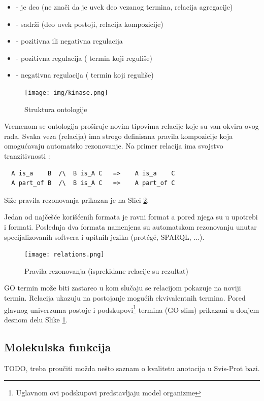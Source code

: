 \begin{itemize}
  \item {}  - je deo  (ne znači da je uvek deo vezanog termina, relacija agregacije)
  \item {} - sadrži (deo uvek postoji, relacija kompozicije)
  \item {} - pozitivna ili negativna regulacija
  \item {} - pozitivna regulacija  
    ( termin koji reguliše)
  \item {} - negativna regulacija 
    ( termin koji reguliše)
\end{itemize}

\begin{figure}[h!]
  \centering
  \texttt{[image: img/kinase.png]}
  \caption{Struktura ontologije}
  \label{fig:kinase}
\end{figure}

Vremenom se ontologija proširuje novim tipovima relacije koje su van okvira ovog rada.
Svaka veza (relacija) ima strogo definisana pravila kompozicije koja omogućavaju
automatsko rezonovanje. Na primer relacija  ima svojstvo
tranzitivnosti \parencite{is_a}:

\begin{verbatim}
  A is_a    B  /\  B is_A C   =>    A is_a    C           
  A part_of B  /\  B is_A C   =>    A part_of C
\end{verbatim}

Siže pravila rezonovanja prikazan je na Slici \ref{fig:relations}.

Jedan od najčešće korišćenih formata je  ravni  format a pored njega
su u upotrebi  i  formati.  Poslednja dva formata
namenjena su automatskom rezonovanju unutar specijalizovanih softvera i upitnih
jezika (protégé, SPARQL, ...).

\begin{figure}[h!]
  \centering
  \texttt{[image: relations.png]}
  \caption{Pravila rezonovanja (isprekidane relacije su rezultat)}
  \label{fig:relations}
\end{figure}

GO termin može biti zastareo u kom slučaju se relacijom 
pokazuje na noviji termin. Relacija  ukazuju na
postojanje mogućih ekvivalentnih termina. Pored glavnog univerzuma postoje i
podskupovi\footnote{Uglavnom ovi podskupovi predstavljaju model organizme}
termina (GO slim) prikazani u donjem desnom delu Slike \ref{fig:kinase}.


\subsection{Molekulska funkcija}
TODO, treba proučiti \parencite{go_mf} možda nešto saznam o kvalitetu anotacija
u Svis-Prot bazi.










